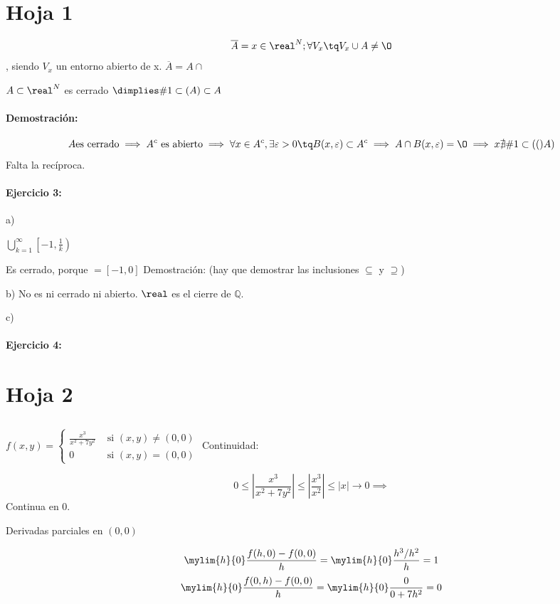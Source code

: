 \documentclass[a4paper,10pt]{apuntes}
\title{}
\author{}
\date{}
\newcommand{\ejer}[1]{\paragraph{Ejercicio #1:}}
\newcommand{\acum}[1]{\#1 \subset(#1) }
\newcommand{\dem}{\paragraph{Demostración:}}
\begin{document}
\section{Hoja 1}

$$\overline{A} = { x \in \real^N; \forall V_x \tq V_x \cup A \neq \text{\O}}$$, siendo $V_x$ un entorno abierto de x.
	$\overline{A} = A \cap $ 
	
\begin{theorem}
$A \subset \real^N$ es cerrado $\dimplies \acum{A}\subset A$ 
\end{theorem}

 

\dem{}
$$A \text{es cerrado} \implies A^c \text{ es abierto} \implies \forall x \in A^c, \exists \varepsilon > 0 \tq B(x,\varepsilon) \subset A^c \implies A \cap B(x,\varepsilon) = \O \implies x \nexists \acum(A)$$
Falta la recíproca.
\ejer{3}

a)

$\displaystyle\bigcup_{k=1}^{\infty} \left[-1,\frac{1}{k}\right)$

Es cerrado, porque $=[-1,0]$
Demostración: (hay que demostrar las inclusiones $\subseteq$ y $\supseteq$)

b)
No es ni cerrado ni abierto.
\obs $\real$ es el cierre de $\mathbb{Q}$.

c)
\ejer{4}
\newpage
\section{Hoja 2}

\subsection{}
$f(x,y) = \left\{\begin{matrix}
                \displaystyle \frac{x^3}{x^2+7y^2} & \text{ si } (x,y) \neq (0,0)\\
                 0 & \text{ si } (x,y) = (0,0)
                \end{matrix}\right.$
Continuidad:

$$0\leq \left| \frac{x^3}{x^2+7y^2} \right| \leq \left| \frac{x^3}{x^2} \right| \leq |x| \rightarrow 0 \implies$$ Continua en 0.

Derivadas parciales en $(0,0)$

$$\mylim{h}{0} \frac{f(h,0) - f(0,0)}{h} = \mylim{h}{0} \displaystyle\frac{{h^3}/{h^2}}{h} = 1$$
$$\mylim{h}{0} \frac{f(0,h) - f(0,0)}{h} = \mylim{h}{0} \frac{0}{0+7h^2} = 0$$
\end{document}
